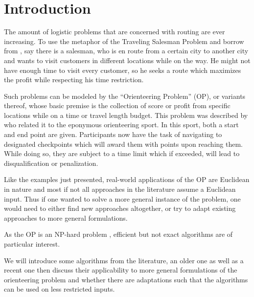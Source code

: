 \section{Introduction}
\label{sec:01:introduction}

The amount of logistic problems that are concerned with routing are ever increasing.
To use the metaphor of the Traveling Salesman Problem and borrow from \citeauthor{chao_fast_1996} \cite{chao_fast_1996},
say there is a salesman, who is en route from a certain city to another city and wants to visit customers in different locations while on the way.
He might not have enough time to visit every customer, so he seeks a route which maximizes the profit while respecting his time restriction.

Such problems can be modeled by the \enquote{Orienteering Problem} (OP), or variants thereof,
whose basic premise is the collection of score or profit from specific locations while on a time or travel length budget. 
This problem was described by \citeauthor{tsiligiridis_heuristic_1984} \cite{tsiligiridis_heuristic_1984} who related it to the eponymous orienteering sport.
In this sport, both a start and end point are given. Participants now have the task of navigating to designated checkpoints which will award them with points upon reaching them.
While doing so, they are subject to a time limit which if exceeded, will lead to disqualification or penalization.

Like the examples just presented, real-world applications of the OP are Euclidean in nature and
most if not all approaches in the literature assume a Euclidean input. \cite{vansteenwegen_orienteering_2011}
Thus if one wanted to solve a more general instance of the problem, one would need to either find new approaches altogether,
or try to adapt existing approaches to more general formulations. 

As the OP is an NP-hard problem \cite{golden_orienteering_1987}, efficient but not exact algorithms are of particular interest.

We will introduce some algorithms from the literature, an older one as well as a recent one 
then discuss their applicability to more general formulations of the orienteering problem
and whether there are adaptations such that the algorithms can be used on less restricted inputs.
